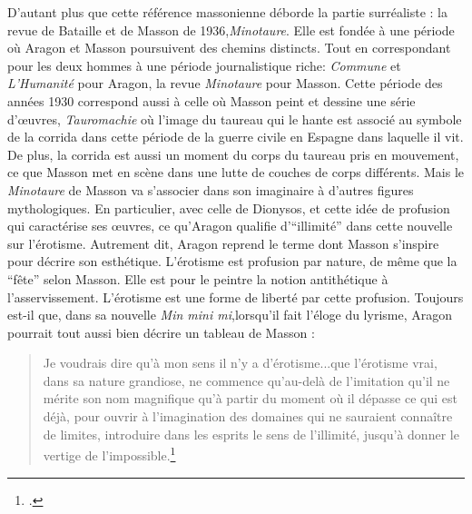 	 D'autant plus que cette référence massonienne déborde la partie surréaliste : la revue de Bataille et de Masson de 1936,\emph{Minotaure}. Elle est fondée à une période où Aragon et Masson poursuivent des chemins distincts. Tout en correspondant pour les deux hommes à une période journalistique riche: \emph{Commune} et \emph{L'Humanité} pour Aragon, la revue \emph{Minotaure} pour Masson. Cette période des années 1930 correspond aussi à celle où Masson peint et dessine une série d'\oe{}uvres, \emph{Tauromachie} où l'image du taureau qui le hante est associé au symbole de la corrida dans cette période de la guerre civile en Espagne dans laquelle il vit. De plus, la corrida est aussi un moment du corps du taureau pris en mouvement, ce que Masson met en scène dans une lutte de couches de corps différents. Mais le \emph{Minotaure} de Masson va s'associer dans son imaginaire à d'autres figures mythologiques. En particulier, avec celle de Dionysos, et cette idée de profusion qui caractérise ses \oe{}uvres, ce qu'Aragon qualifie d'\enquote{illimité} dans cette nouvelle sur l'érotisme. Autrement dit, Aragon reprend le terme dont Masson s'inspire pour décrire son esthétique. L'érotisme est profusion par nature, de même que la \enquote{fête} selon Masson. Elle est pour le peintre la notion antithétique à l'asservissement. L'érotisme est une forme de liberté par cette profusion. Toujours est-il que, dans sa nouvelle \emph{Min mini mi},lorsqu'il fait l'éloge du lyrisme, Aragon pourrait tout aussi bien décrire un tableau de Masson : 

\begin{quote}
Je voudrais dire qu'à mon sens il n'y a d'érotisme...que l'érotisme vrai, dans sa nature grandiose, ne commence qu'au-delà de l'imitation qu'il ne mérite son nom magnifique qu'à partir du moment où il dépasse ce qui est déjà, pour ouvrir à l'imagination des domaines qui ne sauraient connaître de limites, introduire dans les esprits le sens de l'illimité, jusqu'à donner le vertige de l'impossible.\footcite[p496]{mentirvrai}\end{quote}

